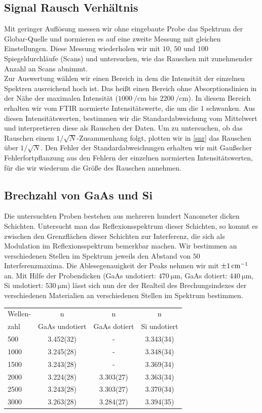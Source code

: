 \documentclass[paper=a4,fontsize=10pt,DIV=18,twocolumn,parskip=half]{scrartcl}
\numberwithin{equation}{section}    %
\begin{document}
\subsection{Signal Rausch Verhältnis}
Mit geringer Auflösung messen wir ohne eingebaute Probe das Spektrum der 
Globar-Quelle und normieren es auf eine zweite Messung mit gleichen 
Einstellungen. Diese Messung wiederholen wir mit $10$, $50$ und $100$ 
Spiegeldurchläufe (Scans) und untersuchen, wie das Rauschen mit zunehmender 
Anzahl an Scans abnimmt.\\
Zur Auswertung wählen wir einen Bereich in dem die Intensität der einzelnen 
Spektren ausreichend hoch ist. Das heißt einen Bereich ohne Absorptionslinien in 
der Nähe der maximalen Intensität ($\SI{1000}{\per\centi\meter}$ bis 
$\SI{2200}{\per\centi\meter}$). In diesem Bereich erhalten wir vom FTIR 
normierte Intensitätswerte, die um die $1$ schwanken. Aus diesen 
Intensitätswerten, bestimmen wir die Standardabweichung vom Mittelwert und 
interpretieren diese als Rauschen der Daten. Um zu untersuchen, ob das Rauschen 
einem $1/\sqrt{N}$-Zusammenhang folgt, plotten wir in \cref{snr} das Rauschen 
über $1/\sqrt{N}$. Den Fehler der Standardabweichungen erhalten wir mit 
Gaußscher Fehlerfortpflanzung aus den Fehlern der einzelnen normierten 
Intensitätswerten, für die wir wiederum die Größe des Rauschen annehmen.


\subsection{Brechzahl von GaAs und Si}
Die untersuchten Proben bestehen aus mehreren hundert Nanometer dicken 
Schichten.
Untersucht man das Reflexionsspektrum dieser Schichten, so kommt es zwischen den 
Grenzflächen dieser Schichten zur Interferenz, die sich als Modulation im 
Reflexionsspektrum bemerkbar machen.  Wir bestimmen an verschiedenen Stellen im 
Spektrum jeweils den Abstand von $50$ Interferenzmaxima. Die Ablesegenauigkeit 
der Peaks nehmen wir mit $\SI{\pm 1}{\centi\meter^{-1}}$ an.
Mit Hilfe der Probendicken (GaAs undotiert: $\SI{470}{\micro\meter}$, GaAs 
dotiert: $\SI{440}{\micro\meter}$, Si undotiert: $\SI{530}{\micro\meter}$) lässt 
sich nun der der Realteil des Brechungsindexes der verschiedenen Materialien an 
verschiedenen Stellen im Spektrum bestimmen.

\begin{tabular}{ l | c c c }
  Wellen- & n & n&n\\
  zahl & GaAs undotiert & GaAs dotiert & Si undotiert \\
  \hline
  500 & 3.452(32) & - & 3.343(34) \\
  1000 & 3.245(28) & - & 3.348(34) \\
  1500 & 3.243(28) & - & 3.369(34) \\
  2000 & 3.224(28) & 3.303(27) & 3.363(34) \\
  2500 & 3.243(28) & 3.303(27) & 3.370(34) \\
  3000 & 3.263(28) & 3.284(27) & 3.394(35) \\
\end{tabular}
\end{document}
